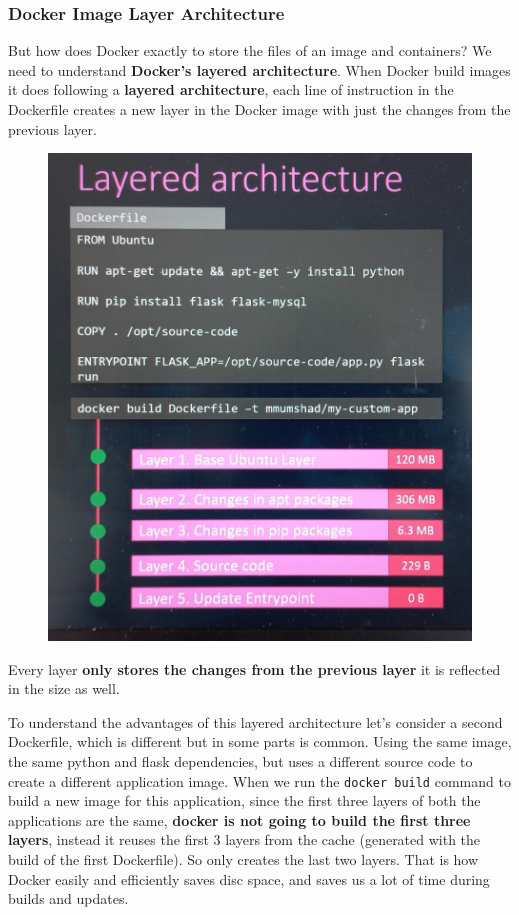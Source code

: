 \documentclass{article}
\begin{document}
\subsubsection{Docker Image Layer Architecture}

But how does Docker exactly to store the files of an image and containers? We need to understand \textbf{Docker's layered architecture}. When Docker build images it does following a \textbf{layered architecture}, each line of instruction in the Dockerfile creates a new layer in the Docker image with just the changes from the previous layer.

\begin{figure}[H]
    \centering
    \includegraphics[scale=0.15]{pictures/st1.png}
\end{figure}

Every layer \textbf{only stores the changes from the previous layer} it is reflected in the size as well.

To understand the advantages of this layered architecture let's consider a second Dockerfile, which is different but in some parts is common. Using the same image, the same python and flask dependencies, but uses a different source code to create a different application image. When we run the \verb|docker build| command to build a new image for this application, since the first three layers of both the applications are the same, \textbf{docker is not going to build the first three layers}, instead it reuses the first 3 layers from the cache (generated with the build of the first Dockerfile). So only creates the last two layers. That is how Docker easily and efficiently saves disc space, and saves us a lot of time during builds and updates.
\end{document}
